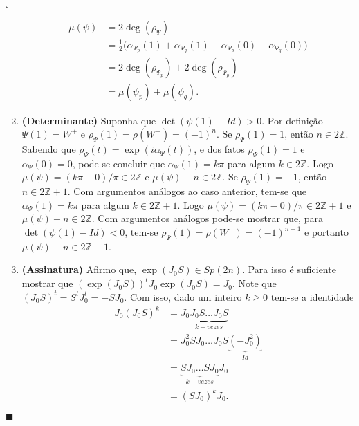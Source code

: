 \documentclass[12pt]{book}
\newenvironment{prova}[1]{$\square$ #1}{\hfill$\blacksquare$}
\newcommand{\estruturacomplexa}{J_{0}}
\newcommand{\gruposimpletico}[1]{Sp(#1)}
\newcommand{\inteiros}{\mathbb{Z}}
\begin{document}
\begin{prova}
\begin{enumerate}
			$$
			\begin{aligned}
			\mu(\psi) &= 2\deg(\rho_{\Psi}) 
			\\
			&= \frac{1}{2}\big(\alpha_{\Psi_{p}}(1)+\alpha_{\Psi_{q}}(1) -\alpha_{\Psi_{p}}(0)-\alpha_{\Psi_{q}}(0) \big) 
			\\
			&= 2\deg(\rho_{\Psi_{p}}) +2\deg(\rho_{\Psi_{p}}) 
			\\
			&=\mu(\psi_{p})+\mu(\psi_{q}).
			\end{aligned}
			$$
			
			\item \textbf{(Determinante)} Suponha que  $\det(\psi(1)- Id)>0$. Por definição $\Psi(1)=W^{+}$ e $\rho_{\Psi}(1) = \rho(W^{+}) = (-1)^{n}$. Se $\rho_{\Psi}(1) =1$, então $n\in 2\inteiros$. Sabendo que $\rho_{\Psi}(t) = \exp(i\alpha_{\Psi}(t))$, e dos fatos $\rho_{\Psi}(1) = 1$ e $\alpha_{\Psi}(0) = 0$, pode-se concluir que $\alpha_{\Psi}(1)=k\pi$ para algum $k \in 2\inteiros$. Logo $\mu(\psi) = (k\pi-0)/\pi \in 2\inteiros$ e $\mu(\psi)-n \in 2\inteiros$. Se $\rho_{\Psi}(1) =-1$, então $n\in 2\inteiros+1$. Com argumentos análogos ao caso anterior, tem-se que $\alpha_{\Psi}(1) = k\pi$ para algum $k\in 2\inteiros+1$. Logo $\mu(\psi) = (k\pi-0)/\pi \in 2\inteiros+1$ e $\mu(\psi)-n \in 2\inteiros$. Com argumentos análogos pode-se mostrar que, para $\det(\psi(1)- Id)<0$, tem-se  $\rho_{\Psi}(1) = \rho(W^{-}) = (-1)^{n-1}$ e portanto $\mu(\psi)-n \in 2\inteiros +1$.
			
			\item \textbf{(Assinatura)}\label{item_assinatura_maslov} Afirmo que, $\exp(\estruturacomplexa S) \in\gruposimpletico{2n}$. Para isso é suficiente mostrar que $(\exp(\estruturacomplexa S))^{t}\estruturacomplexa \exp(\estruturacomplexa S)= \estruturacomplexa$. Note que $(\estruturacomplexa S)^{t} 
			= S^{t}\estruturacomplexa^{t} = -S\estruturacomplexa$. Com isso, dado um inteiro $k\geq 0$ tem-se a identidade 
			$$
			\begin{aligned}
			\estruturacomplexa (\estruturacomplexa S)^{k} 
			&= \estruturacomplexa\underbrace{\estruturacomplexa  S\dots \estruturacomplexa S}_{k-vezes} 
			\\
			&= \estruturacomplexa^{2}  S\estruturacomplexa \dots \estruturacomplexa S \underbrace{(-\estruturacomplexa^{2})}_{Id} 
			\\
			&=\underbrace{ S\estruturacomplexa \dots  S \estruturacomplexa }_{k-vezes}\estruturacomplexa 
			\\
			&= (S\estruturacomplexa)^{k}\estruturacomplexa.
			\end{aligned}
			$$
			

\end{enumerate}
\end{prova}
\end{document}
